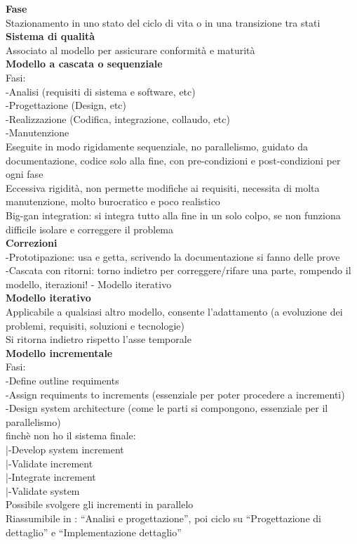 \documentclass{article}
\begin{document}
		\textbf{Fase}\\
		Stazionamento in uno stato del ciclo di vita o in una transizione tra stati\\
		
		\textbf{Sistema di qualità}\\
		Associato al modello per assicurare conformità e maturità\\
		
		
		\textbf{Modello a cascata o sequenziale}\\
		Fasi:\\
		-Analisi (requisiti di sistema e software, etc)\\
		-Progettazione (Design, etc)\\
		-Realizzazione (Codifica, integrazione, collaudo, etc)\\
		-Manutenzione\\
		Eseguite in modo rigidamente sequenziale, no parallelismo, guidato da documentazione, codice solo alla fine, con pre-condizioni e post-condizioni per ogni fase\\
		Eccessiva rigidità, non permette modifiche ai requisiti, necessita di molta manutenzione, molto burocratico e poco realistico\\
		Big-gan integration: si integra tutto alla fine in un solo colpo, se non funziona difficile isolare e correggere il problema\\
		\textbf{Correzioni}\\
		-Prototipazione: usa e getta, scrivendo la documentazione si fanno delle prove\\
		-Cascata con ritorni: torno indietro per correggere/rifare una parte, rompendo il modello, iterazioni! - Modello iterativo\\
		
		\textbf{Modello iterativo}\\
		Applicabile a qualsiasi altro modello, consente l'adattamento (a evoluzione dei problemi, requisiti, soluzioni e tecnologie)\\
		Si ritorna indietro rispetto l'asse temporale\\
		
		\textbf{Modello incrementale}\\
		Fasi:\\
		-Define outline requiments\\
		-Assign requiments to increments (essenziale per poter procedere a incrementi)\\
		-Design system architecture (come le parti si compongono, essenziale per il parallelismo)\\
		finchè non ho il sistema finale:\\
		|-Develop system increment\\
		|-Validate increment\\
		|-Integrate increment\\
		|-Validate system\\
		Possibile svolgere gli incrementi in parallelo\\
		Riassumibile in : ``Analisi e progettazione'', poi ciclo su ``Progettazione di dettaglio'' e ``Implementazione dettaglio''\\
		
\end{document}
